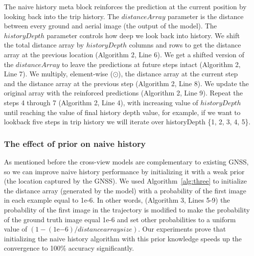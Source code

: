 \documentclass[10pt,letterpaper]{article}
\begin{document}
The naive history meta block reinforces the prediction at the current position by looking back into the trip history. The $distanceArray$ parameter is the distance between every ground and aerial image (the output of the model).  The $historyDepth$ parameter controls how deep we look back into history. We shift the total distance array by $historyDepth$ columns and rows to get the distance array at the previous location (Algorithm 2, Line 6). We get a shifted version of the $distanceArray$ to leave the predictions at future steps intact (Algorithm 2, Line 7).  We multiply, element-wise ($\odot$), the distance array at the current step and the distance array at the previous step (Algorithm 2, Line 8). We update the original array with the reinforced predictions (Algorithm 2, Line 9). Repeat the steps 4 through 7 (Algorithm 2, Line 4), with increasing value of $historyDepth$ until reaching the value of final history depth value, for example, if we want to lookback five steps in trip history we will iterate over historyDepth  \{1, 2, 3, 4, 5\}.

\FloatBarrier

\subsubsection*{The effect of prior on naive history}
As mentioned before the cross-view models are complementary to existing GNSS, so we can improve naive history performance by initializing it with a weak prior (the location captured by the GNSS).  We used Algorithm~\ref{alg:three} to initialize the distance array (generated by the model) with a probability of the first image in each example equal to 1e-6. In other words, (Algorithm 3, Lines 5-9) the probability of the first image in the trajectory is modified to make the probability of the ground truth image equal 1e-6 and set other probabilities to a uniform value of $(1 - (1\mathrm{e}{-6}) / distance array size)$. Our experiments prove that initializing the naive history algorithm with this prior knowledge speeds up the convergence to 100\% accuracy significantly.
\end{document}

